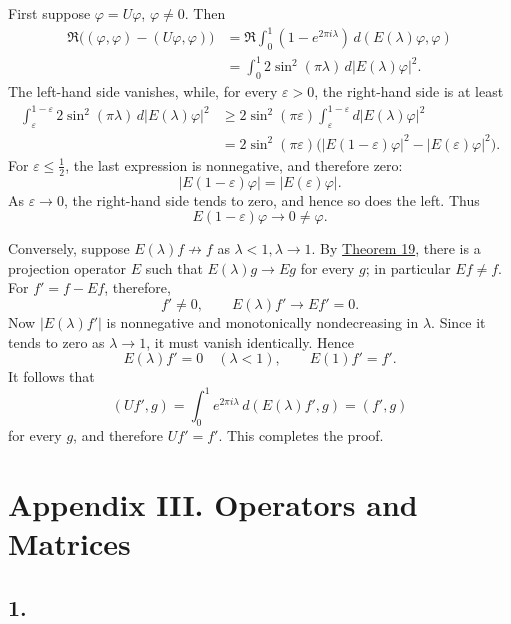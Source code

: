 ﻿\documentclass[paper=b5,fontsize=13pt,bookmarkpackage=false,twoside]{scrartcl}
\begin{document}
First suppose \(\varphi=U\varphi\), \(\varphi\neq0\).  Then
\begin{align*}
 \Re\bigl((\varphi,\varphi)-(U\varphi,\varphi)\bigr)
 &=\Re\int_0^1(1-e^{2\pi i\lambda})\,
             d(E(\lambda)\varphi,\varphi)\\
 &=\int_0^1 2\sin^2(\pi\lambda)\,
             d|E(\lambda)\varphi|^2.
\end{align*}
The left-hand side vanishes, while, for every \(\varepsilon>0\), the
right-hand side is at least
\begin{align*}
 \int_{\varepsilon}^{1-\varepsilon}
   2\sin^2(\pi\lambda)\,d|E(\lambda)\varphi|^2
 &\geq2\sin^2(\pi\varepsilon)
    \int_{\varepsilon}^{1-\varepsilon}
      d|E(\lambda)\varphi|^2\\
 &=2\sin^2(\pi\varepsilon)
   \bigl(|E(1-\varepsilon)\varphi|^2
         -|E(\varepsilon)\varphi|^2\bigr).
\end{align*}
For \(\varepsilon\leq\tfrac12\), the last expression is nonnegative,
and therefore zero:
\[
  |E(1-\varepsilon)\varphi|=|E(\varepsilon)\varphi|.
\]
As \(\varepsilon\to0\), the right-hand side tends to zero, and hence so
does the left.  Thus
\[
  E(1-\varepsilon)\varphi\longrightarrow0\neq\varphi.
\]

Conversely, suppose \(E(\lambda)f\not\to f\) as
\(\lambda<1,\lambda\to1\).  By \hyperref[thm:19]{Theorem 19}, there is
a projection operator \(E\) such that \(E(\lambda)g\to Eg\) for every
\(g\); in particular \(Ef\neq f\).  For \(f'=f-Ef\), therefore,
\[
  f'\neq0,\qquad E(\lambda)f'\longrightarrow Ef'=0.
\]
Now \(|E(\lambda)f'|\) is nonnegative and monotonically nondecreasing
in \(\lambda\).  Since it tends to zero as \(\lambda\to1\), it must
vanish identically.  Hence
\[
  E(\lambda)f'=0\quad(\lambda<1),\qquad E(1)f'=f'.
\]
It follows that
\[
  (Uf',g)=\int_0^1e^{2\pi i\lambda}\,
             d(E(\lambda)f',g)=(f',g)
\]
for every \(g\), and therefore \(Uf'=f'\).  This completes the proof.

\section*{Appendix III. Operators and Matrices}
\label{app:III}

\subsection*{1.}
\label{appIII:1}
\end{document}
